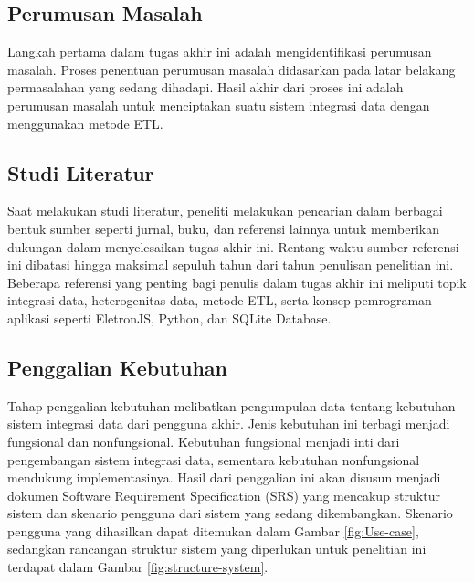 \subsection{Perumusan Masalah}
Langkah pertama dalam tugas akhir ini adalah mengidentifikasi perumusan masalah. Proses penentuan perumusan masalah didasarkan pada latar belakang permasalahan yang sedang dihadapi. Hasil akhir dari proses ini adalah perumusan masalah untuk menciptakan suatu sistem integrasi data dengan menggunakan metode ETL.

\subsection{Studi Literatur}
Saat melakukan studi literatur, peneliti melakukan pencarian dalam berbagai bentuk sumber seperti jurnal, buku, dan referensi lainnya untuk memberikan dukungan dalam menyelesaikan tugas akhir ini. Rentang waktu sumber referensi ini dibatasi hingga maksimal sepuluh tahun dari tahun penulisan penelitian ini. Beberapa referensi yang penting bagi penulis dalam tugas akhir ini meliputi topik integrasi data, heterogenitas data, metode ETL, serta konsep pemrograman aplikasi seperti EletronJS, Python, dan SQLite Database.

\subsection{Penggalian Kebutuhan}
Tahap penggalian kebutuhan melibatkan pengumpulan data tentang kebutuhan sistem integrasi data dari pengguna akhir. Jenis kebutuhan ini terbagi menjadi fungsional dan nonfungsional. Kebutuhan fungsional menjadi inti dari pengembangan sistem integrasi data, sementara kebutuhan nonfungsional mendukung implementasinya. Hasil dari penggalian ini akan disusun menjadi dokumen Software Requirement Specification (SRS) yang mencakup struktur sistem dan skenario pengguna dari sistem yang sedang dikembangkan. Skenario pengguna yang dihasilkan dapat ditemukan dalam Gambar \ref{fig:Use-case}, sedangkan rancangan struktur sistem yang diperlukan untuk penelitian ini terdapat dalam Gambar \ref{fig:structure-system}.


